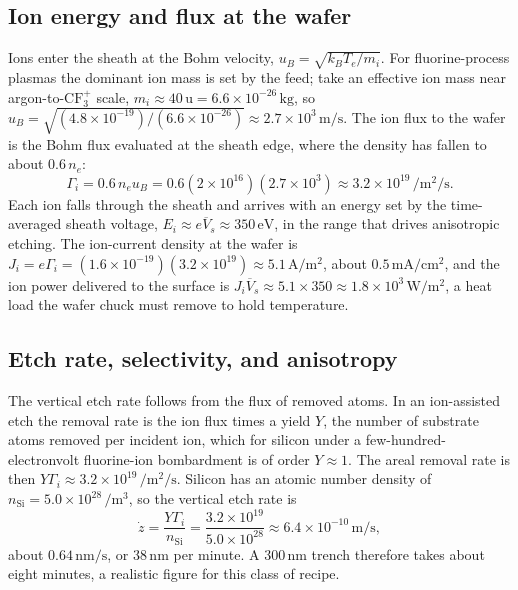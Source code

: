 \subsection{Ion energy and flux at the wafer}

Ions enter the sheath at the Bohm velocity, $u_B = \sqrt{k_B T_e/m_i}$. For
fluorine-process plasmas the dominant ion mass is set by the feed; take an
effective ion mass near argon-to-$\mathrm{CF}_3^+$ scale, $m_i \approx 40\,
\text{u} = 6.6\times 10^{-26}\,\si{\kilogram}$, so $u_B = \sqrt{(4.8\times
10^{-19})/(6.6\times 10^{-26})} \approx 2.7\times 10^{3}\,\si{\meter\per
\second}$. The ion flux to the wafer is the Bohm flux evaluated at the
sheath edge, where the density has fallen to about $0.6\,n_e$:
\[
\Gamma_i = 0.6\,n_e u_B = 0.6(2\times 10^{16})(2.7\times 10^{3})
\approx 3.2\times 10^{19}\,\si{\per\meter\squared\per\second}.
\]
Each ion falls through the sheath and arrives with an energy set by the
time-averaged sheath voltage, $E_i \approx e\overline{V}_s \approx
350\,\si{\electronvolt}$, in the range that drives anisotropic etching. The
ion-current density at the wafer is $J_i = e\Gamma_i = (1.6\times
10^{-19})(3.2\times 10^{19}) \approx 5.1\,\si{\ampere\per\meter\squared}$,
about $0.5\,\si{\milli\ampere\per\centi\meter\squared}$, and the ion power
delivered to the surface is $J_i\overline{V}_s \approx 5.1\times 350 \approx
1.8\times 10^{3}\,\si{\watt\per\meter\squared}$, a heat load the wafer chuck
must remove to hold temperature.

\subsection{Etch rate, selectivity, and anisotropy}

The vertical etch rate follows from the flux of removed atoms. In an
ion-assisted etch the removal rate is the ion flux times a yield $Y$, the
number of substrate atoms removed per incident ion, which for
silicon under a few-hundred-electronvolt fluorine-ion bombardment is of
order $Y \approx 1$. The areal removal rate is then $Y\Gamma_i \approx 3.2
\times 10^{19}\,\si{\per\meter\squared\per\second}$. Silicon has an atomic
number density of $n_{\mathrm{Si}} = 5.0\times 10^{28}\,\si{\per\meter
\cubed}$, so the vertical etch rate is
\[
\dot{z} = \frac{Y\Gamma_i}{n_{\mathrm{Si}}}
= \frac{3.2\times 10^{19}}{5.0\times 10^{28}}
\approx 6.4\times 10^{-10}\,\si{\meter\per\second},
\]
about $0.64\,\si{\nano\meter\per\second}$, or $38\,\si{\nano\meter}$ per
minute. A $300\,\si{\nano\meter}$ trench therefore takes about eight
minutes, a realistic figure for this class of recipe.

